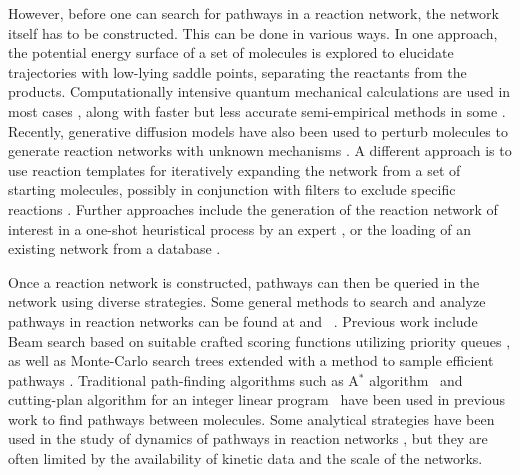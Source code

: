 However, before one can search for pathways in a reaction network, the network itself has to be constructed. This can be done in various ways. In one approach, the potential energy surface of a set of molecules is explored to elucidate trajectories with low-lying saddle points, separating the reactants from the products. Computationally intensive quantum mechanical calculations are used in most cases \cite{crn_expand_qm,crn_expand_qm3}, along with faster but less accurate semi-empirical methods in some \cite{yaks,empi1}.
Recently, generative diffusion models have also been used to perturb molecules to generate reaction networks with unknown mechanisms \cite{OA-ReactDiff,diffusion_ai}.
A different approach is to use reaction templates for iteratively expanding the network from a set of starting molecules, possibly in conjunction with filters to exclude specific reactions \cite{rmg2,molpher}.
Further approaches include the generation of the reaction network of interest in a one-shot heuristical process by an expert \cite{heuristic_expert}, or the loading of an existing network from a database \cite{reported_network}.

Once a reaction network is constructed, pathways can then be queried in the network using diverse strategies. Some general methods to search and analyze pathways in reaction networks can be found at \cite{search_crn} and ~\cite{search_crn2}. Previous work include Beam search based on suitable crafted scoring functions utilizing priority queues \cite{beam_search_pq}, as well as Monte-Carlo search trees extended with a method to sample efficient pathways \cite{mc_trees}.
Traditional path-finding algorithms such as A$^*$ algorithm~\cite{shortest_path_hypergraph2} and cutting-plan algorithm for an integer linear program~\cite{shortest_path_hypergraph1} have been used in previous work to find pathways between molecules.
Some analytical strategies have been used in the study of dynamics of pathways in reaction networks \cite{crn_dynamics,crn_dynamics2}, but they are often limited by the availability of kinetic data and the scale of the networks.

